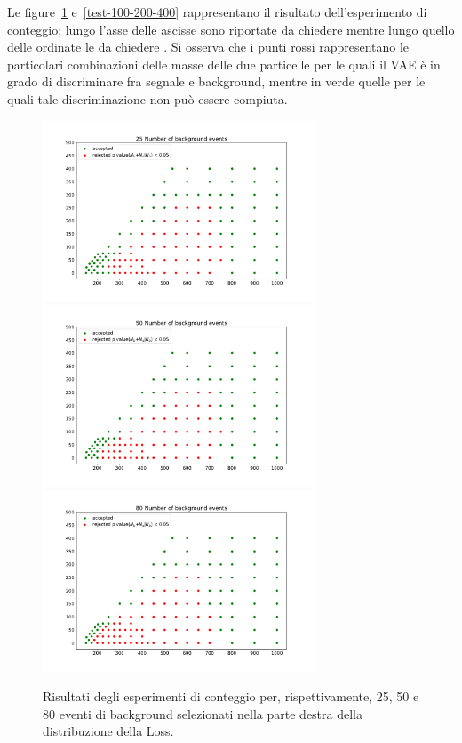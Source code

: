 Le figure~\ref{test-25-50-80} e~\ref{test-100-200-400} rappresentano il risultato dell'esperimento di conteggio; lungo l'asse delle ascisse sono riportate \color{red} da chiedere \color{black} mentre lungo quello delle ordinate le \color{red} da chiedere \color{black}. Si osserva che i punti rossi rappresentano le particolari combinazioni delle masse delle due particelle per le quali il VAE è in grado di discriminare fra segnale e background, mentre in verde quelle per le quali tale discriminazione non può essere compiuta.

\newpage

\begin{figure}[h!]
	\centering
	\includegraphics[width=0.72\textwidth]{figs/risultati_simulazione/25.pdf}
	\includegraphics[width=0.72\textwidth]{figs/risultati_simulazione/50.pdf}
	\includegraphics[width=0.72\textwidth]{figs/risultati_simulazione/80.pdf}
	\caption{Risultati degli esperimenti di conteggio per, rispettivamente, 25, 50 e 80 eventi di background selezionati nella parte destra della distribuzione della Loss.}
	\label{test-25-50-80}
\end{figure}
